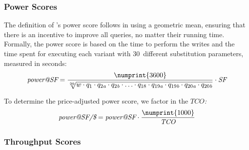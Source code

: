 \subsubsection{Power Scores}
\label{sec:power-score}

The definition of \snbbi's power score follows \tpcH in using a geometric mean, ensuring that there is an incentive to improve all queries, no matter their running time.
Formally, the power score is based on the time to perform the writes
and
the time spent for executing each variant with 30~different substitution parameters, measured in seconds:
$$
\textit{power@SF} =
    \frac{\numprint{3600}}{\sqrt[29]{
        w
        \cdot q_{1}
        \cdot q_{2\variant{a}}
        \cdot q_{2\variant{b}}
        \cdot \ldots
        \cdot q_{18}
        \cdot q_{19\variant{a}}
        \cdot q_{19\variant{b}}
        \cdot q_{20\variant{a}}
        \cdot q_{20\variant{b}}
    }}
    \cdot
    \textit{SF}
$$


To determine the price-adjusted power score, we factor in the $\textit{TCO}$\emph{:}
$$ \textit{power@SF/\$} = \textit{power@SF} \cdot \frac{\numprint{1000}}{\textit{TCO}} $$

\subsubsection{Throughput Scores}
\label{sec:throughput-score}

